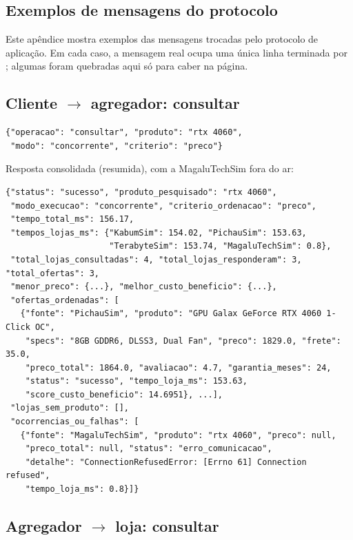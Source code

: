 \begin{apendicesenv}
\partapendices

\chapter{Exemplos de mensagens do protocolo}\label{ap:protocolo}

Este apêndice mostra exemplos das mensagens trocadas pelo protocolo de aplicação. Em cada caso, a mensagem real ocupa uma única linha terminada por ; algumas foram quebradas aqui só para caber na página.

\section{Cliente $\rightarrow$ agregador: consultar}

\begin{lstlisting}[style=json]
{"operacao": "consultar", "produto": "rtx 4060",
 "modo": "concorrente", "criterio": "preco"}
\end{lstlisting}

Resposta consolidada (resumida), com a MagaluTechSim fora do ar:

\begin{lstlisting}[style=json]
{"status": "sucesso", "produto_pesquisado": "rtx 4060",
 "modo_execucao": "concorrente", "criterio_ordenacao": "preco",
 "tempo_total_ms": 156.17,
 "tempos_lojas_ms": {"KabumSim": 154.02, "PichauSim": 153.63,
                     "TerabyteSim": 153.74, "MagaluTechSim": 0.8},
 "total_lojas_consultadas": 4, "total_lojas_responderam": 3, "total_ofertas": 3,
 "menor_preco": {...}, "melhor_custo_beneficio": {...},
 "ofertas_ordenadas": [
   {"fonte": "PichauSim", "produto": "GPU Galax GeForce RTX 4060 1-Click OC",
    "specs": "8GB GDDR6, DLSS3, Dual Fan", "preco": 1829.0, "frete": 35.0,
    "preco_total": 1864.0, "avaliacao": 4.7, "garantia_meses": 24,
    "status": "sucesso", "tempo_loja_ms": 153.63,
    "score_custo_beneficio": 14.6951}, ...],
 "lojas_sem_produto": [],
 "ocorrencias_ou_falhas": [
   {"fonte": "MagaluTechSim", "produto": "rtx 4060", "preco": null,
    "preco_total": null, "status": "erro_comunicacao",
    "detalhe": "ConnectionRefusedError: [Errno 61] Connection refused",
    "tempo_loja_ms": 0.8}]}
\end{lstlisting}

\section{Agregador $\rightarrow$ loja: consultar}


\end{apendicesenv}
